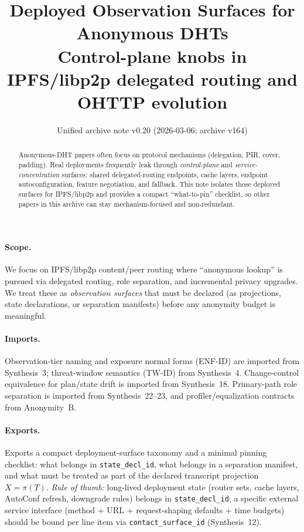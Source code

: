 \documentclass[11pt]{article}
\title{Deployed Observation Surfaces for Anonymous DHTs\\
\large Control-plane knobs in IPFS/libp2p delegated routing and OHTTP evolution}
\author{}
\date{Unified archive note v0.20 (2026-03-06; archive v164)}
\begin{document}
\maketitle

\begin{abstract}
Anonymous-DHT papers often focus on protocol mechanisms (delegation, PIR, cover, padding).
Real deployments frequently leak through \emph{control-plane} and \emph{service-concentration} surfaces: shared delegated-routing endpoints, cache layers, endpoint autoconfiguration, feature negotiation, and fallback.
This note isolates those deployed surfaces for IPFS/libp2p and provides a compact ``what-to-pin'' checklist, so other papers in this archive can stay mechanism-focused and non-redundant.
\end{abstract}

\paragraph{Scope.}
We focus on IPFS/libp2p content/peer routing where ``anonymous lookup'' is pursued via delegated routing, role separation, and incremental privacy upgrades.
We treat these as \emph{observation surfaces} that must be declared (as projections, state declarations, or separation manifests) before any anonymity budget is meaningful.

\paragraph{Imports.}
Observation-tier naming and exposure normal forms (ENF-ID) are imported from Synthesis~3; threat-window semantics (TW-ID) from Synthesis~4.
Change-control equivalence for plan/state drift is imported from Synthesis~18.
Primary-path role separation is imported from Synthesis~22--23, and profiler/equalization contracts from Anonymity~B.
\cite{series:traceifaces,series:threatwindows,series:planstateequiv,series:primarysepmanifest,series:probsep,series:profiling}

\paragraph{Exports.}
Exports a compact deployment-surface taxonomy and a minimal pinning checklist: what belongs in \texttt{state\_decl\_id}, what belongs in a separation manifest, and what must be treated as part of the declared transcript projection $X=\pi(T)$.
\emph{Rule of thumb:} long-lived deployment state (router sets, cache layers, AutoConf refresh, downgrade rules) belongs in \texttt{state\_decl\_id}; a specific external service interface (method + URL + request-shaping defaults + time budgets) should be bound per line item via \texttt{contact\_surface\_id} (Synthesis~12).\cite{series:receiptitems}
\end{document}
